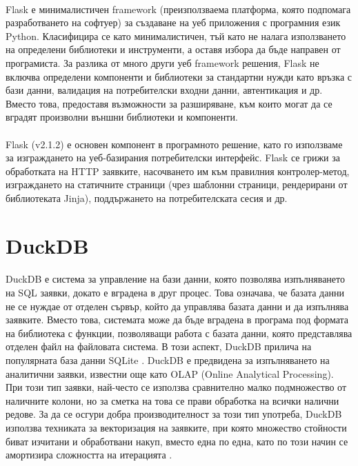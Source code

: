 \documentclass[pdftex,cyrillic,14pt,a4page,twoside,openright]{extreport}
\begin{document}
\paragraph{}
Flask \cite{flask} е минималистичен framework (преизползваема платформа, която подпомага разработването на софтуер) за създаване на уеб приложения с програмния език Python. Класифицира се като минималистичен, тъй като не налага използването на определени библиотеки и инструменти, а оставя избора да бъде направен от програмиста. За разлика от много други уеб framework решения, Flask не включва определени компоненти и библиотеки за стандартни нужди като връзка с бази данни, валидация на потребителски входни данни, автентикация и др. Вместо това, предоставя възможности за разширяване, към които могат да се вградят произволни външни библиотеки и компоненти.

\paragraph{}
Flask (v2.1.2) е основен компонент в програмното решение, като го използваме за изграждането на уеб-базирания потребителски интерфейс. Flask се грижи за обработката на HTTP заявките, насочването им към правилния контролер-метод, изграждането на статичните страници (чрез шаблонни страници, рендерирани от библиотеката Jinja), поддържането на потребителската сесия и др.
\section{DuckDB}\label{sec:duckdb}
\paragraph{}
DuckDB \cite{raasveldt2019} е система за управление на бази данни, която позволява изпълняването на SQL заявки, докато е вградена в друг процес. Това означава, че базата данни не се нуждае от отделен сървър, който да управлява базата данни и да изпълнява заявките. Вместо това, системата може да бъде вградена в програма под формата на библиотека с функции, позволяващи работа с базата данни, която представлява отделен файл на файловата система. В този аспект, DuckDB прилича на популярната база данни SQLite \cite{sqlite2020hipp}. DuckDB е предвидена за изпълняването на аналитични заявки, известни още като OLAP (Online Analytical Processing). При този тип заявки, най-често се използва сравнително малко подмножество от наличните колони, но за сметка на това се прави обработка на всички налични редове. За да се осгури добра производителност за този тип употреба, DuckDB използва техниката за векторизация на заявките, при която множество стойности биват изчитани и обработвани накуп, вместо една по една, като по този начин се амортизира сложността на итерацията \cite{kersten2018}.
\end{document}
